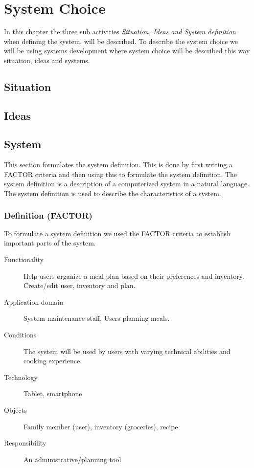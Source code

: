 \chapter{System Choice}
In this chapter the three sub activities \textit{Situation, Ideas and System definition} when defining the system, will be described. To describe the system choice we will be using systems development where system choice will be described this way situation, ideas and systems.

\section{Situation} \label{SituationLabel}


\section{Ideas} \label{IdeasLabel}


\section{System}
This section formulates the system definition. This is done by first writing a FACTOR criteria and then using this to formulate the system definition. The system definition is a description of a computerized system in a natural language. The system definition is used to describe the characteristics of a system.
\subsection{Definition (FACTOR)}
To formulate a system definition we used the FACTOR \cite{OOAD_BATOF} criteria to establish important parts of the system.

\begin{description}
	\item[Functionality] Help users organize a meal plan based on their preferences and inventory. Create/edit user, inventory and plan.
	\item[Application domain] System maintenance staff, Users planning meals.
	\item[Conditions] The system will be used by users with varying technical abilities and cooking experience.
	\item[Technology] Tablet, smartphone
	\item[Objects] Family member (user), inventory (groceries), recipe
	\item[Responsibility] An administrative/planning tool
\end{description}

